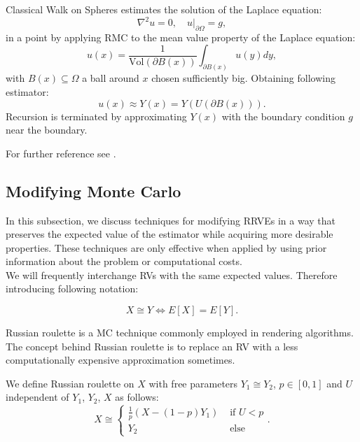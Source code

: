 \documentclass[a4paper,12pt]{article}
\begin{document}
\begin{example} \label{ex: walk on spheres}
  Classical Walk on Spheres estimates the solution of the Laplace equation:
  \begin{equation} \label{eq:laplace}
    \nabla^2 u = 0, \quad u|_{\partial \Omega} = g,
  \end{equation}
  in a point by applying RMC to the mean value property of the Laplace equation:
  \begin{equation}\label{eq:mean value}
    u(x) = \frac{1}{\text{Vol}(\partial B(x))} \int_{\partial B(x)} u(y) dy,
  \end{equation}
  with $B(x) \subseteq \Omega$ a ball around $x$ chosen sufficiently big.
  Obtaining following estimator:
  \begin{equation}
    u(x) \approx Y(x) = Y(U(\partial B(x)))
    .
  \end{equation}
  Recursion is terminated by approximating $Y(x)$ with the boundary condition $g$
  near the boundary.
\end{example}

\begin{related}
  For further reference see \cite{sawhney_monte_nodate}.
\end{related}


\subsection{Modifying Monte Carlo}

In this subsection, we discuss techniques for modifying RRVEs
in a way that preserves the expected value of the estimator while
acquiring more desirable properties. These techniques are only
effective when applied by using prior information
about the problem or computational costs. \\

We will frequently interchange RVs with the same expected values.
Therefore introducing following notation:
\begin{notation}[$\cong$]
  \[
    X \cong Y \iff E[X]=E[Y]
    .\]
\end{notation}

Russian roulette is a MC technique commonly employed in rendering algorithms.
The concept behind Russian roulette is to replace an RV with a
less computationally expensive approximation sometimes.

\begin{definition} \label{Russian roulette}
  We define Russian roulette on $X$ with free parameters
  $Y_{1} \cong Y_{2}$, $p \in [0,1]$
  and $U$ independent of $Y_{1}$, $Y_{2}$, $X$
  as follows:
  \begin{equation}
    X \cong
    \begin{cases}
      \frac{1}{p}(X - (1-p)Y_{1}) & \text{ if } U < p \\
      Y_{2}                       & \text{ else }
    \end{cases}.
  \end{equation}
\end{definition}
\end{document}
